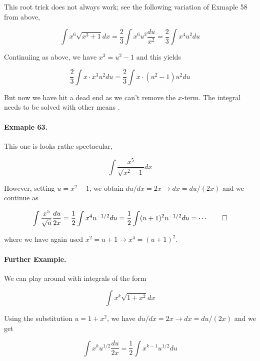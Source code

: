 This root trick does not always work; see the following variation of Exmaple 58 from above,

\begin{equation*}
    \int x^6 \sqrt{x^3+1} dx = \frac{2}{3} \int x^6 u^2 \frac{du}{x^2} = \frac{2}{3} \int x^4 u^2 du 
\end{equation*}

Continuiing as above, we have $x^3 = u^2 - 1$ and this yields

\begin{equation*}
    \frac{2}{3} \int x \cdot x^3 u^2 du = \frac{2}{3} \int x \cdot (u^2 - 1) u^2 du
\end{equation*}

But now we have hit a dead end as we can't remove the $x$-term. The integral needs to be solved with other means .

\paragraph{Exmaple 63.} This one is looks rathe spectacular,

\begin{equation*}
    \int \frac{x^5}{\sqrt{x^2 -1}} dx
\end{equation*}

However, setting $u=x^2-1$, we obtain $du/dx = 2x \rightarrow dx = du/(2x)$ and we continue as

\begin{equation*}
    \int \frac{x^5}{\sqrt{u}} \frac{du}{2x} = \frac{1}{2} \int x^4 u^{-1/2} du = \frac{1}{2} \int (u+1)^2 u^{-1/2} du = \cdots \qed
\end{equation*}

where we have again used $x^2 = u+1 \rightarrow x^4 = (u+1)^2$.

\paragraph{Further Example.} We can play around with integrals of the form

\begin{equation*}
    \int x^k \sqrt{1+x^2} dx
\end{equation*}

Using the substitution $u=1+x^2$, we have $du/dx = 2x \rightarrow dx = du/(2x)$ and we get

\begin{equation*}
    \int x^k u^{1/2} \frac{du}{2x} = \frac{1}{2} \int x^{k-1} u^{1/2} du  
\end{equation*}

